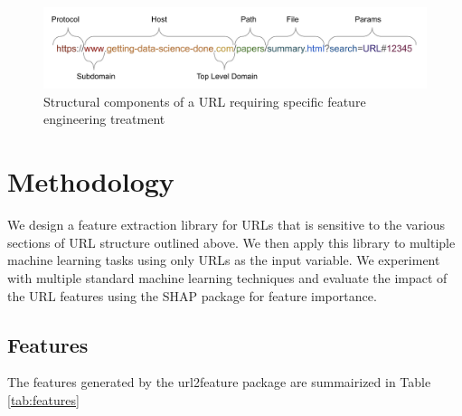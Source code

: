 \documentclass[sigconf]{acmart}
\begin{document}
\begin{figure}
\centering
\includegraphics[scale=0.3]{images/URL_parts.png}
\caption{Structural components of a URL requiring specific feature engineering treatment}
\label{fig:url_structure}
\end{figure}



\section{Methodology}

We design a feature extraction library for URLs that is sensitive to the various sections of URL
structure outlined above. We then apply this library to multiple machine learning tasks using only URLs
as the input variable. We experiment with multiple standard machine learning techniques and evaluate
the impact of the URL features using the SHAP package for feature importance.

\subsection{Features}

The features generated by the url2feature package are summairized in Table \ref{tab:features}
\end{document}
